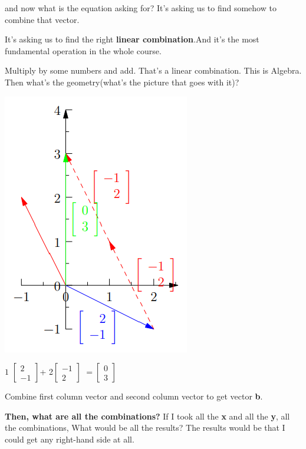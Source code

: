 \documentclass{article}
\begin{document}
and now what is the equation asking for?
It's asking us to find somehow to combine that vector. 

It's asking us to find the right \textbf{linear combination}.And it's the most fundamental operation in the whole course.

Multiply by some numbers and add. That's a linear combination. This is Algebra. Then what's the geometry(what's the picture that goes with it)?
\begin{center}
\includegraphics{images/colpicture.png}
    
\end{center}

\begin{center}
$1$
$\begin{bmatrix}
2  \\
-1  
\end{bmatrix}
$+ 2$
\begin{bmatrix}
-1\\
2
\end{bmatrix}$
$=
\begin{bmatrix}
0\\
3
\end{bmatrix}$

\end{center}
Combine first column vector and second column vector to get vector \textbf{b}.

\textbf{Then, what are all the combinations?} If I took all the \textbf{x} and all the \textbf{y}, all the combinations, What would be all the results? The results would be that I could get any right-hand side at all.
\end{document}

